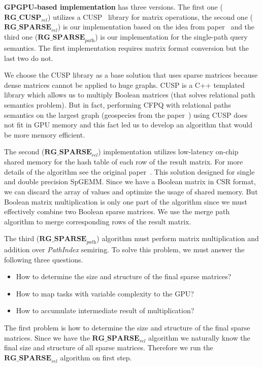 \textbf{GPGPU-based implementation} has three versions.
The first one ($\textbf{RG\_CUSP}_{\textit{rel}}$) utilizes a CUSP~\cite{Cusp} library for matrix operations, the second one ($\textbf{RG\_SPARSE}_{\textit{rel}}$) is our implementation based on the idea from paper~\cite{NsparsePaper} and the third one ($\textbf{RG\_SPARSE}_{\textit{path}}$) is our implementation for the single-path query semantics.
The first implementation requires matrix format conversion but the last two do not.

We choose the CUSP library as a base solution that uses sparse matrices because dense matrices cannot be applied to huge graphs. CUSP is a C++ templated library which allows us to multiply Boolean matrices (that solves relational path semantics problem). But in fact, performing CFPQ with relational paths semantics on the largest graph (geospecies from the paper~\cite{Kuijpers:2019:ESC:3335783.3335791}) using CUSP does not fit in GPU memory and this fact led us to develop an algorithm that would be more memory efficient.

The second ($\textbf{RG\_SPARSE}_{\textit{rel}}$) implementation utilizes low-latency on-chip shared memory for the hash table of each row of the result matrix. For more details of the algorithm see the original paper~\cite{NsparsePaper}. This solution designed for single and double precision SpGEMM. Since we have a Boolean matrix in CSR format, we can discard the array of values and optimize the usage of shared memory. But Boolean matrix multiplication is only one part of the algorithm since we must effectively combine two Boolean sparse matrices. We use the merge path~\cite{GpuMergePathPaper} algorithm to merge corresponding rows of the result matrix.

The third ($\textbf{RG\_SPARSE}_{\textit{path}}$) algorithm must perform matrix multiplication and addition over \textit{PathIndex} semiring. To solve this problem, we must answer the following three questions. 

\begin{itemize}
  \item How to determine the size and structure of the final sparse matrices?
  \item How to map tasks with variable complexity to the GPU?
  \item How to accumulate intermediate result of multiplication?
\end{itemize}

The first problem is how to determine the size and structure of the final sparse matrices. Since we have the $\textbf{RG\_SPARSE}_{\textit{rel}}$ algorithm we naturally know the final size and structure of all sparse matrices. Therefore we run the $\textbf{RG\_SPARSE}_{\textit{rel}}$ algorithm on first step.

